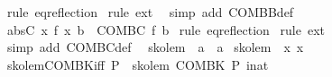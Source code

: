 \begin{isabellebody}
%
\isadelimproof
%
\endisadelimproof
%
\isatagproof
{}\isamarkupfalse%
\ {\isacharparenleft}{\kern0pt}rule\ eq{\isacharunderscore}{\kern0pt}reflection{\isacharparenright}{\kern0pt}\isanewline
{}\isamarkupfalse%
\ {\isacharparenleft}{\kern0pt}rule\ ext{\isacharparenright}{\kern0pt}\ \isanewline
{}\isamarkupfalse%
\ {\isacharparenleft}{\kern0pt}simp\ add{\isacharcolon}{\kern0pt}\ COMBB{\isacharunderscore}{\kern0pt}def{\isacharparenright}{\kern0pt}\ \isanewline
{}\isamarkupfalse%
%
\endisatagproof
{\isafoldproof}%
%
\isadelimproof
\isanewline
%
\endisadelimproof
\isanewline
{}\isamarkupfalse%
\ abs{\isacharunderscore}{\kern0pt}C{\isacharcolon}{\kern0pt}\ {\isachardoublequoteopen}{\isasymlambda}x{\isachardot}{\kern0pt}\ {\isacharparenleft}{\kern0pt}f\ x{\isacharparenright}{\kern0pt}\ b\ {\isasymequiv}\ COMBC\ f\ b{\isachardoublequoteclose}\isanewline
%
\isadelimproof
%
\endisadelimproof
%
\isatagproof
{}\isamarkupfalse%
\ {\isacharparenleft}{\kern0pt}rule\ eq{\isacharunderscore}{\kern0pt}reflection{\isacharparenright}{\kern0pt}\isanewline
{}\isamarkupfalse%
\ {\isacharparenleft}{\kern0pt}rule\ ext{\isacharparenright}{\kern0pt}\ \isanewline
{}\isamarkupfalse%
\ {\isacharparenleft}{\kern0pt}simp\ add{\isacharcolon}{\kern0pt}\ COMBC{\isacharunderscore}{\kern0pt}def{\isacharparenright}{\kern0pt}\ \isanewline
{}\isamarkupfalse%
%
\endisatagproof
{\isafoldproof}%
%
\isadelimproof
%
\endisadelimproof
%
\isadelimdocument
%
\endisadelimdocument
%
\isatagdocument
%
\isamarkuptrue%
%
\endisatagdocument
{\isafolddocument}%
%
\isadelimdocument
%
\endisadelimdocument
{}\isamarkupfalse%
\ skolem\ {\isacharcolon}{\kern0pt}{\isacharcolon}{\kern0pt}\ {\isachardoublequoteopen}{\isacharprime}{\kern0pt}a\ {\isasymRightarrow}\ {\isacharprime}{\kern0pt}a{\isachardoublequoteclose}\ \isanewline
{\isachardoublequoteopen}skolem\ {\isacharequal}{\kern0pt}\ {\isacharparenleft}{\kern0pt}{\isasymlambda}x{\isachardot}{\kern0pt}\ x{\isacharparenright}{\kern0pt}{\isachardoublequoteclose}\isanewline
\isanewline
{}\isamarkupfalse%
\ skolem{\isacharunderscore}{\kern0pt}COMBK{\isacharunderscore}{\kern0pt}iff{\isacharcolon}{\kern0pt}\ {\isachardoublequoteopen}P\ {\isasymlongleftrightarrow}\ skolem\ {\isacharparenleft}{\kern0pt}COMBK\ P\ {\isacharparenleft}{\kern0pt}i{\isacharcolon}{\kern0pt}{\isacharcolon}{\kern0pt}nat{\isacharparenright}{\kern0pt}{\isacharparenright}{\kern0pt}{\isachardoublequoteclose}\isanewline

\end{isabellebody}
